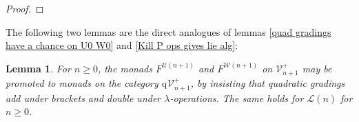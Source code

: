 \documentclass[11pt]{amsart} \renewcommand{\baselinestretch}{1.4}
\theoremstyle{plain}
\newtheorem{lem}[thm]{Lemma}
\theoremstyle{definition}
\newcommand{\calU}{\mathcal{U}}
\newcommand{\calV}{\mathcal{V}}
\newcommand{\calw}{\mathcal{W}}
\newcommand{\call}{\mathcal{L}}
\newcommand{\vect}[2]{\calV^{#1}_{#2}}
\newcommand{\quadgrad}[1]{\mathrm{q}_{#1}}
\begin{document}
\begin{homotopy operations for PRLs}
\begin{proof}
\end{proof}
The following two lemmas are the direct analogues of lemmas \ref{quad gradings have a chance on U0 W0} and \ref{Kill P ops gives lie alg}:
\begin{lem}
\label{quad gradings have a chance on Un Wn}
For $n\geq0$, the monads $F^{\calU(n+1)}$ and $F^{\calw(n+1)}$ on $\vect{+}{n+1}$ may be promoted to monads on the category $\quadgrad{}\vect{+}{n+1}$, by insisting that quadratic gradings add under brackets and double under $\lambda$-operations. The same holds for $\call(n)$ for $n\geq0$.
\end{lem}

\end{homotopy operations for PRLs}
\end{document}
